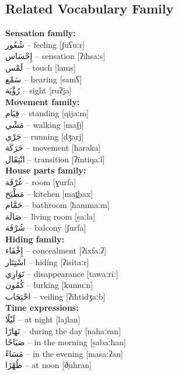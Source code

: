 \documentclass[letter,12pt]{article}
\begin{document}
\subsection{Related Vocabulary Family}
\begin{multicols}{2}

\textbf{Sensation family:}\\
\textarabic{شُعُور} – feeling [ʃuʕuːr]\\
\textarabic{إِحْسَاس} – sensation [ʔiħsaːs]\\
\textarabic{لَمْس} – touch [lams]\\
\textarabic{سَمْع} – hearing [samʕ]\\
\textarabic{رُؤْيَة} – sight [ruʔja]\\

\textbf{Movement family:}\\
\textarabic{قِيَام} – standing [qijaːm]\\
\textarabic{مَشْي} – walking [maʃj]\\
\textarabic{جَرْي} – running [dʒarj]\\
\textarabic{حَرَكَة} – movement [ħaraka]\\
\textarabic{انْتِقَال} – transition [ʔintiqaːl]\\

\textbf{House parts family:}\\
\textarabic{غُرْفَة} – room [ɣurfa]\\
\textarabic{مَطْبَخ} – kitchen [mat̪bax]\\
\textarabic{حَمَّام} – bathroom [ħammaːm]\\
\textarabic{صَالَة} – living room [s̱aːla]\\
\textarabic{شُرْفَة} – balcony [ʃurfa]\\

\textbf{Hiding family:}\\
\textarabic{إِخْفَاء} – concealment [ʔixfaːʔ]\\
\textarabic{اسْتِتَار} – hiding [ʔisitaːr]\\
\textarabic{تَوَارِي} – disappearance [tawaːriː]\\
\textarabic{كُمُون} – lurking [kumuːn]\\
\textarabic{احْتِجَاب} – veiling [ʔiħtidʒaːb]\\

\textbf{Time expressions:}\\
\textarabic{لَيْلًا} – at night [lajlan]\\
\textarabic{نَهَارًا} – during the day [nahaːran]\\
\textarabic{صَبَاحًا} – in the morning [s̱abaːħan]\\
\textarabic{مَسَاءً} – in the evening [masaːʔan]\\
\textarabic{ظُهْرًا} – at noon [ð̩uhran]\\


\end{multicols}
\end{document}
